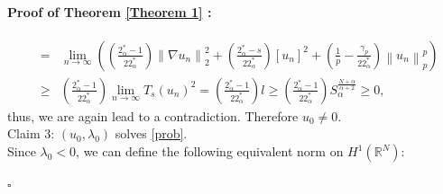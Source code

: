 \documentclass[11pt]{article}
\numberwithin{equation}{section}
\numberwithin{mytheorem}{section}
\newenvironment{myproof}[2] {\paragraph{Proof of {#1} {#2} :}}{\hfill$\square$}
\begin{document}
\begin{myproof}{Theorem}{\ref{Theorem 1}}
\begin{eqnarray*}
				& = & \lim_{n\rightarrow \infty} \left(\left(\frac{2^*_{\alpha}-1}{22^*_{\alpha}}\right)\left\| \nabla u_n \right\|_2^2+\left(\frac{2^*_{\alpha}-s}{22^*_{\alpha}}\right)[u_n]^2+\left(\frac{1}{p}-\frac{\gamma_p}{22^*_{\alpha}}\right)\left\| u_n \right\|_p^p\right)\\
				& \geq & \left(\frac{2^*_{\alpha}-1}{22^*_{\alpha}}\right)\lim_{n\rightarrow \infty}T_s(u_n)^2= \left(\frac{2^*_{\alpha}-1}{22^*_{\alpha}}\right)l\geq \left(\frac{2^*_{\alpha}-1}{22^*_{\alpha}}\right)S_{\alpha}^{\frac{N+\alpha}{\alpha+2}}\geq 0,
			\end{eqnarray*}
			thus, we are again lead to a contradiction. Therefore $u_0\neq 0$.\\
			Claim 3: $(u_0, \lambda_0)$ solves \eqref{prob}.\\
			Since $\lambda_0<0$, we can define the following equivalent norm on $H^1(\mathbb{R}^N)$:
			

\end{myproof}
\end{document}
